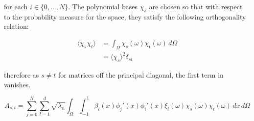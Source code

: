 for each $i \in \{0,\ldots,N\}$. The polynomial bases $\chi_s$ are chosen so
that with respect to the probability measure for the space, they satisfy the
following orthogonality relation:

\begin{align*}
    \langle\chi_s\chi_t\rangle
      &= \int_\Omega\chi_s(\omega)\chi_t(\omega)\, d\Omega \\
      &= \langle\chi_s\rangle^2\delta_{st}
\end{align*}

therefore as $s \neq t$ for matrices off the principal diagonal, the first term
in  vanishes.


\begin{equation}
    A_{s,t} = \sum_{j=0}^N
        \sum_{l=1}^d\sqrt{\lambda_n}\int_\Omega\int_{-1}^1
       \beta_l(x)\phi_j'(x)\phi_i'(x)\xi_l(\omega)\chi_s(\omega)\chi_t(\omega)
       \, dx\, d\Omega
\end{equation}

